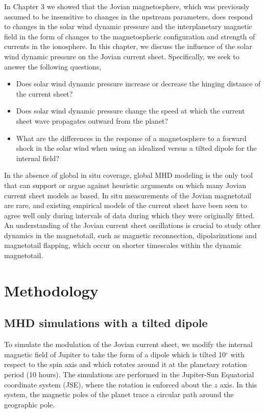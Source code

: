 In Chapter 3 we showed that the Jovian magnetosphere, which was previously assumed to be insensitive to changes in the upstream parameters, does respond to changes in the solar wind dynamic pressure and the interplanetary magnetic field in the form of changes to the magnetospheric configuration and strength of currents in the ionosphere. In this chapter, we discuss the influence of the solar wind dynamic pressure on the Jovian current sheet. Specifically, we seek to answer the following questions,

\begin{itemize}
    \item Does solar wind dynamic pressure increase or decrease the hinging distance of the current sheet?
    \item Does solar wind dynamic pressure change the speed at which the current sheet wave propagates outward from the planet?
    \item What are the differences in the response of a magnetosphere to a forward shock in the solar wind when using an idealized versus a tilted dipole for the internal field?
\end{itemize}

In the absence of global in situ coverage, global MHD modeling is the only tool that can support or argue against heuristic arguments on which many Jovian current sheet models as based. In situ measurements of the Jovian magnetotail are rare, and existing empirical models of the current sheet have been seen to agree well only during intervals of data during which they were originally fitted. An understanding of the Jovian current sheet oscillations is crucial to study other dynamics in the magnetotail, such as magnetic reconnection, dipolarizations and magnetotail flapping, which occur on shorter timescales within the dynamic magnetotail. 

\section{Methodology}

\subsection{MHD simulations with a tilted dipole}
To simulate the modulation of the Jovian current sheet, we modify the internal magnetic field of Jupiter to take the form of a dipole which is tilted 10$^\circ$ with respect to the spin axis and which rotates around it at the planetary rotation period (10 hours). The simulations are performed in the Jupiter-Sun Equatorial coordinate system (JSE), where the rotation is enforced about the $z$ axis. In this system, the magnetic poles of the planet trace a circular path around the geographic pole. 

